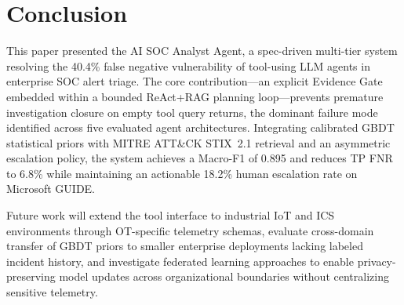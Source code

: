 \section{Conclusion}
\label{sec:conclusion}

This paper presented the AI SOC Analyst Agent, a spec-driven multi-tier system
resolving the 40.4\% false negative vulnerability of tool-using LLM agents in
enterprise SOC alert triage. The core contribution---an explicit Evidence Gate
embedded within a bounded ReAct+RAG planning loop---prevents premature investigation
closure on empty tool query returns, the dominant failure mode identified across
five evaluated agent architectures. Integrating calibrated GBDT statistical priors
with MITRE ATT\&CK STIX~2.1 retrieval and an asymmetric escalation policy, the
system achieves a Macro-F1 of 0.895 and reduces TP FNR to 6.8\% while maintaining
an actionable 18.2\% human escalation rate on Microsoft GUIDE.

Future work will extend the tool interface to industrial IoT and ICS environments
through OT-specific telemetry schemas, evaluate cross-domain transfer of GBDT
priors to smaller enterprise deployments lacking labeled incident history, and
investigate federated learning approaches to enable privacy-preserving model
updates across organizational boundaries without centralizing sensitive telemetry.
